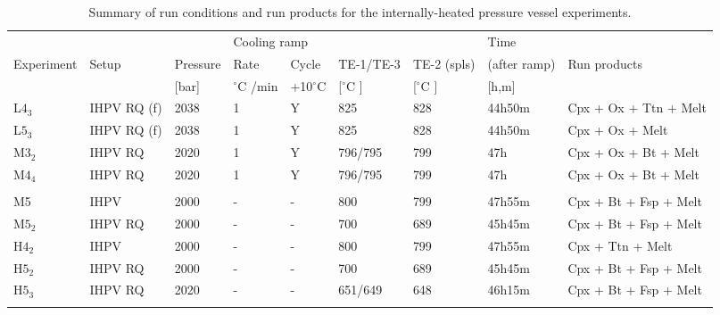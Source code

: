 \documentclass[review,authoryear,12pt]{elsarticle}
\newcommand{\dgC}{$^\circ$C }
\begin{document}
 \begin{table}[htpb]
\caption{Summary of run conditions and run products for the internally-heated pressure vessel experiments.} 
\begin{adjustbox}{max width=\textwidth}
\begin{tabular}{lllllllll}
\toprule            &                 &           & \multicolumn{2}{l}{Cooling ramp} &           &             & Time         &          \\
Experiment   & Setup           & Pressure  & Rate         & Cycle & TE-1/TE-3 & TE-2 (spls) & (after ramp) & Run products         \\
             &                 & {[}bar{]} & \dgC/min       & +10\dgC & {[}\dgC{]}  & {[}\dgC{]}    & {[}h,m{]}     &                      \\ \midrule
L$4_3$        & IHPV RQ (f) 	   & 2038      & 1            & Y     & 825       & 828         & 44h50m       & Cpx + Ox + Ttn + Melt \\
L$5_3$        & IHPV RQ (f)     & 2038      & 1            & Y     & 825       & 828         & 44h50m       & Cpx + Ox + Melt       \\
M$3_2$        & IHPV RQ        & 2020      & 1            & Y     & 796/795   & 799         & 47h         & Cpx + Ox + Bt + Melt  \\
M$4_4$        & IHPV RQ        & 2020      & 1            & Y     & 796/795   & 799         & 47h         & Cpx + Ox + Bt + Melt  \\
             &                 &           &              &       &           &             &              &                      \\
M5           & IHPV            & 2000      & -            & -     & 800       & 799         & 47h55m       & Cpx + Bt + Fsp + Melt \\
M$5_2$     & IHPV RQ        & 2000      & -            & -     & 700       & 689         & 45h45m       & Cpx + Bt + Fsp + Melt \\
H$4_2$     & IHPV            & 2000      & -            & -     & 800       & 799         & 47h55m       & Cpx + Ttn + Melt      \\
H$5_2$     & IHPV RQ        & 2000      & -            & -     & 700       & 689         & 45h45m       & Cpx + Bt + Fsp + Melt \\
H$5_3$        & IHPV RQ        & 2020      & -            & -     & 651/649   & 648         & 46h15m       & Cpx + Bt + Fsp + Melt \\
             &                 &           &              &       &           &             &              &                      \\

\end{tabular}
\end{adjustbox}
\end{table}
\end{document}
